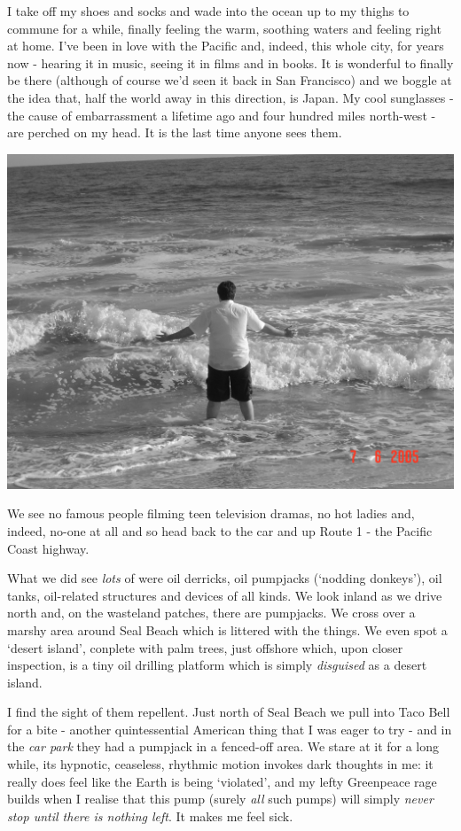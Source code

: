 \documentclass[a5paper,titlepage,11pt]{book}
\begin{document}
I take off my shoes and socks and wade into the ocean up to my thighs to commune for a while, finally feeling the warm, soothing waters and feeling right at home.  I've been in love with the Pacific and, indeed, this whole city, for years now - hearing it in music, seeing it in films and in books.  It is wonderful to finally be there (although of course we'd seen it back in San Francisco) and we boggle at the idea that, half the world away in this direction, is Japan.  My cool sunglasses - the cause of embarrassment a lifetime ago and four hundred miles north-west - are perched on my head.  It is the last time anyone sees them.

\begin{center}\includegraphics[width=\textwidth]{gfx/pacific}\end{center}

We see no famous people filming teen television dramas, no hot ladies and, indeed, no-one at all and so head back to the car and up Route 1 - the Pacific Coast highway.

What we did see \emph{lots} of were oil derricks, oil pumpjacks (`nodding donkeys'), oil tanks, oil-related structures and devices of all kinds.  We look inland as we drive north and, on the wasteland patches, there are pumpjacks.  We cross over a marshy area around Seal Beach which is littered with the things.  We even spot a `desert island', conplete with palm trees, just offshore which, upon closer inspection, is a tiny oil drilling platform which is simply \emph{disguised} as a desert island.

I find the sight of them repellent.  Just north of Seal Beach we pull into Taco Bell for a bite - another quintessential American thing that I was eager to try - and in the \emph{car park} they had a pumpjack in a fenced-off area.  We stare at it for a long while, its hypnotic, ceaseless, rhythmic motion invokes dark thoughts in me: it really does feel like the Earth is being `violated', and my lefty Greenpeace rage builds when I realise that this pump (surely \emph{all} such pumps) will simply \emph{never stop until there is nothing left}.  It makes me feel sick.
\end{document}
